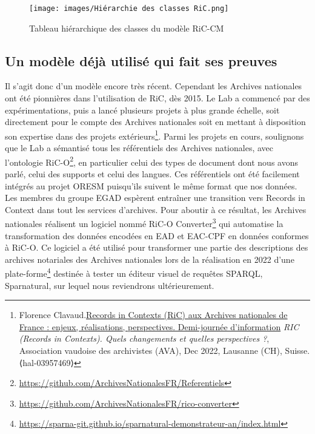 \par
\begin{figure}[ht]
    \centering
    \texttt{[image: images/Hiérarchie des classes RiC.png]}
    \caption{Tableau hiérarchique des classes du modèle RiC-CM}
    \label{fig:tableauclassericcm}
\end{figure}
\subsection{Un modèle déjà utilisé qui fait ses preuves}
Il s'agit donc d'un modèle encore très récent. Cependant les Archives nationales ont été pionnières dans l'utilisation de RiC, dès 2015. Le Lab a commencé par des expérimentations, puis a lancé plusieurs projets à plus grande échelle, soit directement pour le compte des Archives nationales soit en mettant à disposition son expertise dans des projets extérieurs\footnote{Florence Clavaud.\href{https://rec.unil.ch/videos/florence-clavaud-ric-aux-archives-nationales-de-france-enjeux-realisation-perspectives/}{Records in Contexts (RiC) aux Archives nationales de France : enjeux, réalisations, perspectives. Demi-journée d'information} \textit{RIC (Records in Contexts). Quels changements et quelles perspectives ?}, Association vaudoise des archivistes (AVA), Dec 2022, Lausanne (CH), Suisse. ⟨hal-03957469⟩}. Parmi les projets en cours, soulignons que le Lab a sémantisé tous les référentiels des Archives nationales, avec l'ontologie RiC-O\footnote{\href{https://github.com/ArchivesNationalesFR/Referentiels}{https://github.com/ArchivesNationalesFR/Referentiels}}, en particulier celui des types de document dont nous avons parlé, celui des supports et celui des langues. Ces référentiels ont été facilement intégrés au projet ORESM puisqu'ils suivent le même format que nos données. 
Les membres du groupe EGAD espèrent entraîner une transition vers Records in Context dans tout les services d'archives. Pour aboutir à ce résultat, les Archives nationales réalisent un logiciel nommé RiC-O Converter\footnote{\href{https://github.com/ArchivesNationalesFR/rico-converter}{https://github.com/ArchivesNationalesFR/rico-converter}} qui automatise la transformation des données encodées en EAD et EAC-CPF en données conformes à RiC-O. Ce logiciel a été utilisé pour transformer une partie des descriptions des archives notariales des Archives nationales lors de la réalisation en 2022 d'une plate-forme\footnote{\href{https://sparna-git.github.io/sparnatural-demonstrateur-an/index.html}{https://sparna-git.github.io/sparnatural-demonstrateur-an/index.html}} destinée à tester un éditeur visuel de requêtes SPARQL, Sparnatural, sur lequel nous reviendrons ultérieurement.




